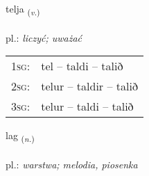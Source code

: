 \documentclass[frontgrid, backgrid]{flacards}\usepackage[]{graphicx}\usepackage[]{xcolor}
\begin{document}
{telja \small{\textsubscript{(\textit{v.})}} \\[1ex] %
\textphonetic{[tʰɛlja]} \\
pl.: \emph{liczyć; uważać} \\  [2ex]
\renewcommand*{\arraystretch}{0.8}
\begin{tabular}{p{1cm}l}
\textsc{1sg}: & tel -- taldi -- talið \\ 
\textsc{2sg}: & telur -- taldir -- talið \\ 
\textsc{3sg}: & telur -- taldi -- talið \\ 
\end{tabular}
}

\renewcommand{\flhead}{\vskip5pt \fboxsep=0pt {\small\bfseries\footnotesize Nafnorð | rzeczownik}}
\renewcommand{\fcfoot}{\vskip5pt \fboxsep=0pt \hspace{2pt}{\small\bfseries\footnotesize 1K}}

\renewcommand{\blhead}{\vskip5pt {\small\bfseries\footnotesize Nafnorð | rzeczownik }}
\renewcommand{\bcfoot}{\vskip5pt \hspace{2pt}{\small\bfseries\footnotesize 1K}}


{lag \small{\textsubscript{(\textit{n.})}} \\[1ex] %
\textphonetic{[laːɣ]} \\
pl.: \emph{warstwa; melodia, piosenka} \\  [2ex]
\renewcommand*{\arraystretch}{0.8}
}


\renewcommand{\flhead}{\vskip5pt \fboxsep=0pt {\small\bfseries\footnotesize Atviksorð | przysłówek}}
\renewcommand{\fcfoot}{\vskip5pt \fboxsep=0pt \hspace{2pt}{\small\bfseries\footnotesize 1K}}
\end{document}
